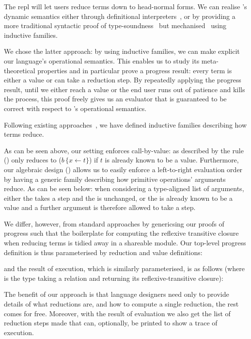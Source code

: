 The \Velo{} \acs*{repl} will let users reduce terms down to head-normal forms.
%
We can realise \Velo{}'s dynamic semantics either through definitional
interpreters~\cite{10.1145/3093333.3009866,Augustsson1999edt},
or by providing a more traditional syntactic proof of
type-soundness~\cite{DBLP:journals/iandc/WrightF94}
but mechanised~\cite[Part 2: Properties]{plfa22.08} using inductive families.

We chose the latter approach: by using inductive families, we can make explicit
our language's operational semantics.
%
This enables us to study its meta-theoretical properties and in particular prove
a progress result: every term is either a value or can take a reduction step.
%
By repeatedly applying the progress result, until we either reach a value or the end
user runs out of patience and kills the process, this proof freely gives us an
evaluator that is guaranteed to be correct with respect to \Velo{}'s operational
semantics.

Following existing approaches~\cite[Part 2: Properties]{plfa22.08}, we have defined
inductive families describing how terms reduce.


As can be seen above, our setting enforces call-by-value:
as described by the rule 
() only reduces to
($b \, \lbrace x \leftarrow t \rbrace$)
if $t$ is already known to be a value.
%
Furthermore, our algebraic design () allows
us to easily enforce a left-to-right evaluation order by having a generic
family describing how primitive operations' arguments reduce.
%
As can be seen below: when considering a type-aligned list of arguments,
either the  takes a step and the  is unchanged,
or the  is already known to be a value and a further argument
is therefore allowed to take a step.


We differ, however, from standard approaches by genericsing our proofs of progress such that the boilerplate for computing the reflexive transitive closure when reducing terms is tidied away in a shareable module.
%
Our top-level progress definition is thus parameterised by reduction and value definitions:


\noindent
and the result of execution, which is similarly parameterised, is as follows
(where  is the type taking a relation and returning its
reflexive-transitive closure):


The benefit of our approach is that language designers need only to provide details of what reductions are, and how to compute a single reduction, the rest comes for free.
%
Moreover, with the result of evaluation we also get the list of reduction steps made that can, optionally, be printed to show a trace of execution.

